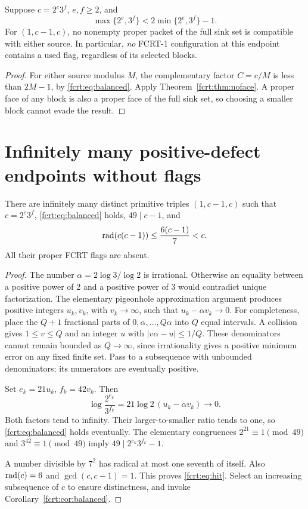 \begin{corollary}\label{fcrt:cor:balanced}
Suppose \(c=2^e3^f\), \(e,f\ge2\), and
\begin{equation}\label{fcrt:eq:balanced}
 \max\{2^e,3^f\}<2\min\{2^e,3^f\}-1.
\end{equation}
For \((1,c-1,c)\), no nonempty proper packet of the full sink set is
compatible with either source. In particular, \emph{no} FCRT-1 configuration
at this endpoint contains a used flag, regardless of its selected blocks.
\end{corollary}
\begin{proof}
For either source modulus \(M\), the complementary factor \(C=c/M\)
is less than \(2M-1\), by \eqref{fcrt:eq:balanced}. Apply
Theorem~\ref{fcrt:thm:noface}. A proper face of any block is also a proper face
of the full sink set, so choosing a smaller block cannot evade the result.
\end{proof}

\section{Infinitely many positive-defect endpoints without flags}
\begin{theorem}\label{fcrt:thm:infinite}
There are infinitely many distinct primitive triples \((1,c-1,c)\) such
that \(c=2^e3^f\), \eqref{fcrt:eq:balanced} holds, \(49\mid c-1\), and
\begin{equation}\label{fcrt:eq:hit}
 \operatorname{rad}(c(c-1))\le\frac{6(c-1)}7<c.
\end{equation}
All their proper FCRT flags are absent.
\end{theorem}
\begin{proof}
The number \(\alpha=2\log3/\log2\) is irrational. Otherwise an equality
between a positive power of 2 and a positive power of 3 would contradict
unique factorization. The elementary pigeonhole approximation argument
produces positive integers \(u_k,v_k\), with \(v_k\to\infty\), such that
\(u_k-\alpha v_k\to0\). For completeness, place the \(Q+1\) fractional
parts of \(0,\alpha,\ldots,Q\alpha\) into \(Q\) equal intervals. A
collision gives \(1\le v\le Q\) and an integer \(u\) with
\(|v\alpha-u|\le1/Q\). These denominators cannot remain bounded as
\(Q\to\infty\), since irrationality gives a positive minimum error on any
fixed finite set. Pass to a subsequence with unbounded denominators; its
numerators are eventually positive.

Set \(e_k=21u_k\), \(f_k=42v_k\). Then
\[
 \log\frac{2^{e_k}}{3^{f_k}}
       =21\log2\,(u_k-\alpha v_k)\longrightarrow0.
\]
Both factors tend to infinity. Their larger-to-smaller ratio tends to one,
so \eqref{fcrt:eq:balanced} holds eventually. The elementary congruences
\(2^{21}\equiv1\pmod{49}\) and \(3^{42}\equiv1\pmod{49}\)
imply \(49\mid2^{e_k}3^{f_k}-1\).

A number divisible by \(7^2\) has radical at most one seventh of itself.
Also \(\operatorname{rad}(c)=6\) and \(\gcd(c,c-1)=1\). This proves
\eqref{fcrt:eq:hit}. Select an increasing subsequence of \(c\) to ensure
distinctness, and invoke Corollary~\ref{fcrt:cor:balanced}.
\end{proof}



